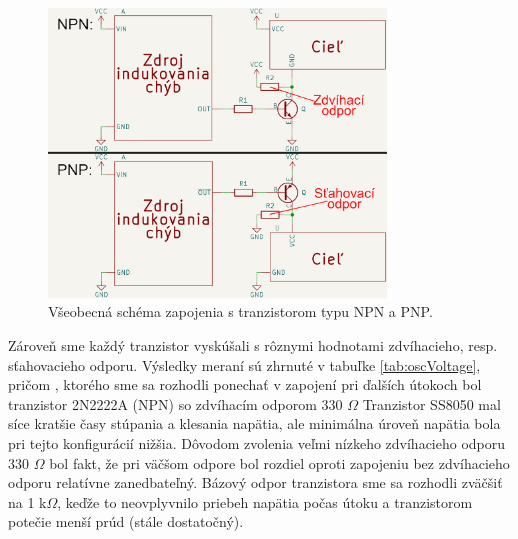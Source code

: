 \begin{figure}
    \centerline{\includegraphics[width=0.8\textwidth]{images/npnVpnp.png}}
    \caption[Všeobecná schéma zapojenia s tranzistorom typu NPN a PNP]{Všeobecná schéma zapojenia s tranzistorom typu NPN a PNP.}
    \label{obr:npnVpnp}
\end{figure}

Zároveň sme každý tranzistor vyskúšali s rôznymi hodnotami zdvíhacieho, resp. sťahovacieho odporu. Výsledky meraní sú zhrnuté v tabuľke \ref{tab:oscVoltage}, pričom , ktorého sme sa rozhodli ponechať v zapojení pri ďalších útokoch bol tranzistor 2N2222A (NPN) so zdvíhacím odporom 330 $\Omega$ Tranzistor SS8050 mal síce kratšie časy stúpania a klesania napätia, ale minimálna úroveň napätia bola pri tejto konfigurácií nižšia. Dôvodom zvolenia veľmi nízkeho zdvíhacieho odporu 330 $\Omega$ bol fakt, že pri väčšom odpore bol rozdiel oproti zapojeniu bez zdvíhacieho odporu relatívne zanedbateľný. Bázový odpor tranzistora sme sa rozhodli zväčšiť na 1 k$\Omega$, keďže to neovplyvnilo priebeh napätia počas útoku a tranzistorom potečie menší prúd (stále dostatočný).

